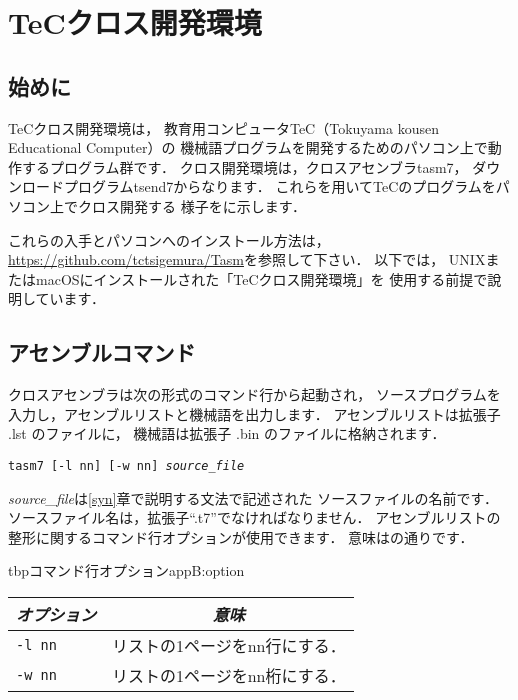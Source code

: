 \renewcommand{\myincludegraphics}[2]{\texttt{[image: appB/\#1]}}

\newpage
\chapter{TeCクロス開発環境}
\label{cross}
\section{始めに}
TeCクロス開発環境は，
教育用コンピュータTeC（Tokuyama kousen Educational Computer）の
機械語プログラムを開発するためのパソコン上で動作するプログラム群です．
クロス開発環境は，クロスアセンブラtasm7，
ダウンロードプログラムtsend7からなります．
これらを用いてTeCのプログラムをパソコン上でクロス開発する
様子をに示します．

これらの入手とパソコンへのインストール方法は，
\url{https://github.com/tctsigemura/Tasm}を参照して下さい．
以下では，
UNIXまたはmacOSにインストールされた「TeCクロス開発環境」を
使用する前提で說明しています．


\section{アセンブルコマンド}
クロスアセンブラは次の形式のコマンド行から起動され，
ソースプログラムを入力し，アセンブルリストと機械語を出力します．
アセンブルリストは拡張子 .lst のファイルに，
機械語は拡張子 .bin のファイルに格納されます．

\begin{center}
{\small\tt tasm7 [-l nn] [-w nn] {\it source\_file} }
\end{center}

{\it source\_file}は\ref{syn}章で説明する文法で記述された
ソースファイルの名前です．
ソースファイル名は，拡張子``.t7''でなければなりません．
アセンブルリストの整形に関するコマンド行オプションが使用できます．
意味はの通りです．

\begin{mytable}{tbp}{コマンド行オプション}{appB:option}
{\small\begin{tabular}{l | l} \hline\hline
\multicolumn{1}{c|}{\it オプション} & \multicolumn{1}{c}{\it 意味} \\ \hline
{\tt -l nn}  &  リストの1ページをnn行にする． \\
{\tt -w nn}  &  リストの1ページをnn桁にする．
\end{tabular}}
\end{mytable}

